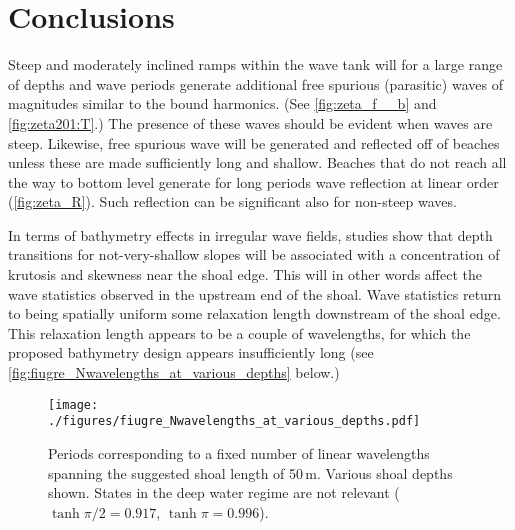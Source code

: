 \documentclass[internal]{sintefmemo}
\begin{document}
\section{Conclusions}
Steep and moderately inclined ramps within the wave tank will for a large range of depths and wave periods generate additional free spurious (parasitic) waves of magnitudes similar to the bound harmonics. (See \autoref{fig:zeta_f__b} and \ref{fig:zeta201:T}.)  
The presence of these waves should be evident when waves are steep.
Likewise, free spurious wave will be generated and reflected off of beaches unless these are made sufficiently long and shallow. 
Beaches that do not reach all the way to bottom level generate for long periods wave reflection at linear order (\autoref{fig:zeta_R}). Such reflection can be significant also for non-steep waves.


In terms of bathymetry effects in irregular wave fields, studies show that depth transitions for not-very-shallow slopes will be associated with a concentration of krutosis and skewness near the shoal edge. This will in other words affect the wave statistics observed in the upstream end of the shoal. Wave statistics return to being spatially uniform some relaxation length downstream of the shoal edge. This relaxation length appears to be a couple of wavelengths, for which the proposed bathymetry design appears insufficiently long (see \autoref{fig:fiugre_Nwavelengths_at_various_depths} below.)


\begin{figure}[H]%
\centering
\texttt{[image: ./figures/fiugre\_Nwavelengths\_at\_various\_depths.pdf]}%
\caption{Periods corresponding to a fixed number of linear wavelengths spanning the suggested shoal length of 50\,m. Various shoal depths shown. States in the deep water regime are not relevant ($\tanh\pi/2 = 0.917$, $\tanh\pi =0.996$).}%
\label{fig:fiugre_Nwavelengths_at_various_depths}%
\end{figure}

\end{document}
